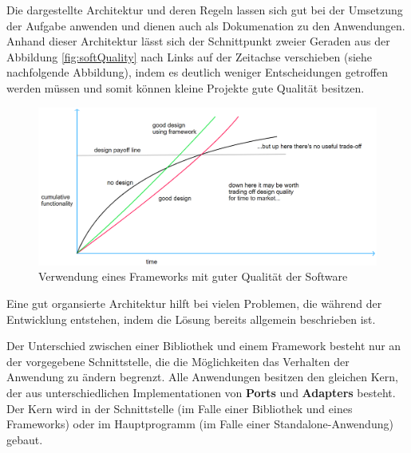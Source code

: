 Die dargestellte Architektur und deren Regeln lassen sich gut bei der Umsetzung der Aufgabe anwenden 
und dienen auch als Dokumenation zu den Anwendungen. Anhand dieser Architektur lässt sich der Schnittpunkt zweier Geraden 
aus der Abbildung \ref{fig:softQuality} nach Links auf der Zeitachse verschieben (siehe nachfolgende Abbildung),
indem es deutlich weniger Entscheidungen getroffen werden müssen und somit können kleine Projekte 
gute Qualität besitzen.

\begin{figure}[H]
    \centering
    \includegraphics[width=1\textwidth]{./images/QASoftwareCompareWithFramework.png}
    \caption[Verwendung eines Frameworks mit guter Qualität der Software]{Verwendung eines Frameworks mit guter Qualität der Software}
    \label{fig:softQualityWithFramework}
\end{figure} 

Eine gut organsierte Architektur hilft bei vielen Problemen, die während der Entwicklung entstehen, 
indem die Lösung bereits allgemein beschrieben ist. 

Der Unterschied zwischen einer Bibliothek und einem Framework besteht nur an der vorgegebene Schnittstelle, 
die die Möglichkeiten das Verhalten der Anwendung zu ändern begrenzt. 
Alle Anwendungen besitzen den gleichen Kern, der aus unterschiedlichen Implementationen von \textbf{Ports} und \textbf{Adapters} besteht.
Der Kern wird in der Schnittstelle (im Falle einer Bibliothek und eines Frameworks) oder im Hauptprogramm (im Falle einer Standalone-Anwendung) gebaut.


